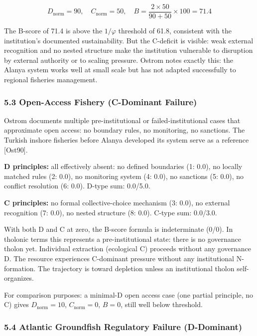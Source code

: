\documentclass[
  11pt,
  letterpaper,
]{article}
\begin{document}
\[D_{\text{norm}} = 90, \quad C_{\text{norm}} = 50, \quad B = \frac{2 \times 50}{90 + 50} \times 100 = 71.4\]

The B-score of 71.4 is above the \(1/\varphi\) threshold of 61.8,
consistent with the institution's documented sustainability. But the
C-deficit is visible: weak external recognition and no nested structure
make the institution vulnerable to disruption by external authority or
to scaling pressure. Ostrom notes exactly this: the Alanya system works
well at small scale but has not adapted successfully to regional
fisheries management.

\subsubsection{5.3 Open-Access Fishery (C-Dominant
Failure)}\label{open-access-fishery-c-dominant-failure}

Ostrom documents multiple pre-institutional or failed-institutional
cases that approximate open access: no boundary rules, no monitoring, no
sanctions. The Turkish inshore fisheries before Alanya developed its
system serve as a reference {[}Ost90{]}.

\textbf{D principles:} all effectively absent: no defined boundaries (1:
0.0), no locally matched rules (2: 0.0), no monitoring system (4: 0.0),
no sanctions (5: 0.0), no conflict resolution (6: 0.0). D-type sum:
0.0/5.0.

\textbf{C principles:} no formal collective-choice mechanism (3: 0.0),
no external recognition (7: 0.0), no nested structure (8: 0.0). C-type
sum: 0.0/3.0.

With both D and C at zero, the B-score formula is indeterminate (0/0).
In tholonic terms this represents a pre-institutional state: there is no
governance tholon yet. Individual extraction (ecological C) proceeds
without any governance D. The resource experiences C-dominant pressure
without any institutional N-formation. The trajectory is toward
depletion unless an institutional tholon self-organizes.

For comparison purposes: a minimal-D open access case (one partial
principle, no C) gives \(D_{\text{norm}} = 10\),
\(C_{\text{norm}} = 0\), \(B = 0\), still well below threshold.

\subsubsection{5.4 Atlantic Groundfish Regulatory Failure
(D-Dominant)}\label{atlantic-groundfish-regulatory-failure-d-dominant}
\end{document}
